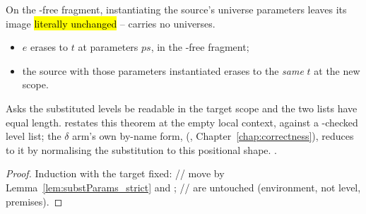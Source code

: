 \begin{theorem}
\label{thm:Erases-instL}
\leanok
{}
 On the -free fragment, instantiating the source's universe parameters leaves its \lbox{} image \hl{literally unchanged} -- \lbox{} carries no universes.
\begin{itemize}
\item {} $e$ erases to $t$ at parameters $\mathit{ps}$, in the -free fragment;
\item {} the source with those parameters instantiated erases to the \emph{same} $t$ at the new scope.
\end{itemize}
 Asks the substituted levels be readable in the target scope and the two lists have equal length.  restates this theorem at the empty local context, against a -checked level list; the $\delta$ arm's own by-name form,  (, Chapter~\ref{chap:correctness}), reduces to it by normalising the substitution to this positional shape.
 \stProved{}.
\end{theorem}
\begin{proof}
\leanok
{}
 Induction with the target fixed: // move by
Lemma~\ref{lem:substParams_strict} and ; //
 are untouched (environment, not level, premises).
\end{proof}

